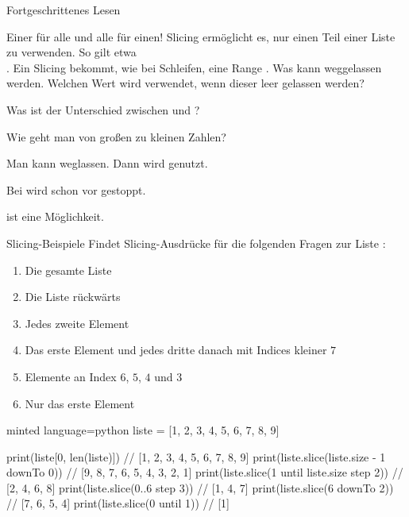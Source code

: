 \begin{task}[points=auto]{Fortgeschrittenes Lesen}
    \begin{subtask*}[points=0]{Einer für alle und alle für einen! }
        Slicing ermöglicht es, nur einen Teil einer Liste zu verwenden.
        So gilt etwa \\\pythoninline{[1, 2, 3, 4][1:3] == [2, 3]}.
        Ein Slicing bekommt, wie bei Schleifen, eine Range .
        Was kann weggelassen werden. Welchen Wert wird verwendet,
        wenn dieser leer gelassen werden?

        Was ist der Unterschied zwischen 
        und ?

        Wie geht man von großen zu kleinen Zahlen?

        \begin{solution}
            Man kann  weglassen.
            Dann wird  genutzt.

            Bei  wird schon vor  gestoppt.

             ist eine Möglichkeit.
        \end{solution}
    \end{subtask*}
    \begin{subtask*}[points=0]{Slicing-Beispiele }
        Findet Slicing-Ausdrücke für die folgenden Fragen zur Liste :

        \begin{enumerate}
            \item Die gesamte Liste
            \item Die Liste rückwärts
            \item Jedes zweite Element
            \item Das erste Element und jedes dritte danach mit Indices kleiner $7$
            \item Elemente an Index $6$, $5$, $4$ und $3$
            \item Nur das erste Element
        \end{enumerate}

        \begin{solution}
            \begin{codeBlock}[]{minted language=python}
                liste = [1, 2, 3, 4, 5, 6, 7, 8, 9]

                print(liste[0, len(liste)])   // [1, 2, 3, 4, 5, 6, 7, 8, 9]
                print(liste.slice(liste.size - 1 downTo 0))  // [9, 8, 7, 6, 5, 4, 3, 2, 1]
                print(liste.slice(1 until liste.size step 2))  // [2, 4, 6, 8]
                print(liste.slice(0..6 step 3))       // [1, 4, 7]
                print(liste.slice(6 downTo 2))        // [7, 6, 5, 4]
                print(liste.slice(0 until 1))         // [1]
            \end{codeBlock}
        \end{solution}
    \end{subtask*}
\end{task}
